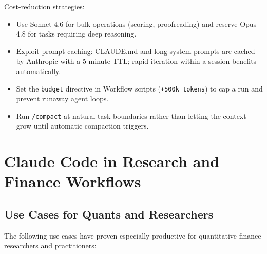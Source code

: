 Cost-reduction strategies:

\begin{itemize}
  \item Use Sonnet 4.6 for bulk operations (scoring, proofreading) and reserve
        Opus 4.8 for tasks requiring deep reasoning.
  \item Exploit prompt caching: CLAUDE.md and long system prompts are cached by
        Anthropic with a 5-minute TTL; rapid iteration within a session benefits
        automatically.
  \item Set the \texttt{budget} directive in Workflow scripts
        (\texttt{+500k tokens}) to cap a run and prevent runaway agent loops.
  \item Run \texttt{/compact} at natural task boundaries rather than letting
        the context grow until automatic compaction triggers.
\end{itemize}

\section{Claude Code in Research and Finance Workflows}
\label{app:claude-code:finance}

\subsection{Use Cases for Quants and Researchers}
\label{app:claude-code:use-cases}

The following use cases have proven especially productive for quantitative
finance researchers and practitioners:


